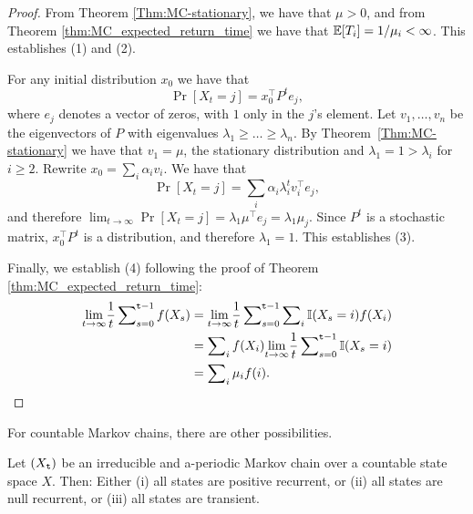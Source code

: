 \begin{proof}
From Theorem \ref{Thm:MC-stationary}, we have that $\mu >0$, and from Theorem \ref{thm:MC_expected_return_time} we have that $\mathbb{E}[T_i] = 1/\mu_i < \infty$. This establishes (1) and (2).

For any initial distribution $x_0$ we have that
\[
\Pr
[X_t=j]= x_0^\top P^t e_j,
\]
where $e_j$ denotes a vector of zeros, with $1$ only in the $j$'s element. Let $v_1, \ldots , v_n$ be the eigenvectors of $P$ with eigenvalues
$\lambda_1 \geq  \ldots \geq  \lambda_n$. By
Theorem~\ref{Thm:MC-stationary} we have that $v_1=\mu$, the stationary
distribution and $\lambda_1=1>\lambda_i$ for $i\geq 2$. Rewrite
$x_0=\sum_i \alpha_i v_i$. We have that
\[
\Pr
[X_t=j]= \sum_i \alpha_i \lambda_i^t v_i^\top e_j,
\]
and therefore ${\lim _{t \to \infty }}\Pr
[X_t=j] = \lambda_1 \mu^\top e_j 
 = \lambda_1 {\mu_j}$.
Since $P^t$ is a stochastic matrix,
$x_0^\top P^t$ is a distribution, and therefore $\lambda_1 = 1$. This establishes (3). 

Finally, we establish (4) following the proof of Theorem \ref{thm:MC_expected_return_time}:
\begin{equation}
    \begin{split}
{\lim _{t \to \infty }}\frac{1}{t}\sum\nolimits_{s = 0}^{{\tt t} - 1} f({X_s}) &= {\lim _{t \to \infty }}\frac{1}{t}\sum\nolimits_{s = 0}^{{\tt t} - 1} \sum\nolimits_{i}\mathbb{I} (X_s=i)f({X_i})\\
&=\sum\nolimits_{i}f({X_i}){\lim _{t \to \infty }}\frac{1}{t}\sum\nolimits_{s = 0}^{{\tt t} - 1} \mathbb{I} (X_s=i)\\
&= \sum\nolimits_i {\mu_i f(i)}.
    \end{split}
\end{equation}
\end{proof}

For countable Markov chains, there are other possibilities.

\begin{theorem}
\label{thm:countableMC}
Let $({X_{\tt t}})$ be an irreducible and a-periodic Markov chain
over a countable state space $X$.  Then:
Either (i) all states are positive recurrent, or (ii) all states are null recurrent, or (iii) all states are transient.
\end{theorem}



